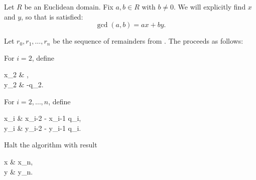 \begin{algorithm}\label{alg:extended_euclidean_algorithm}
  Let \( R \) be an Euclidean domain. Fix \( a, b \in R \) with \( b \neq 0 \). We will explicitly find \( x \) and \( y \), so that  is satisfied:
  \begin{equation*}
    \gcd(a, b) = ax + by.
  \end{equation*}

  Let \( r_0, r_1, \ldots, r_n \) be the sequence of remainders from . The  proceeds as follows:

  \begin{thmenum}
     For \( i = 2 \), define
    \begin{balign*}
      x_2 & ,    \\
      y_2 & \coloneqq -q_2.
    \end{balign*}

     For \( i = 2, \ldots, n \), define
    \begin{balign*}
      x_i & \coloneqq x_{i-2} - x_{i-1} q_i, \\
      y_i & \coloneqq y_{i-2} - y_{i-1} q_i.
    \end{balign*}

     Halt the algorithm with result
    \begin{balign*}
      x & \coloneqq x_n, \\
      y & \coloneqq y_n.
    \end{balign*}
  \end{thmenum}
\end{algorithm}
